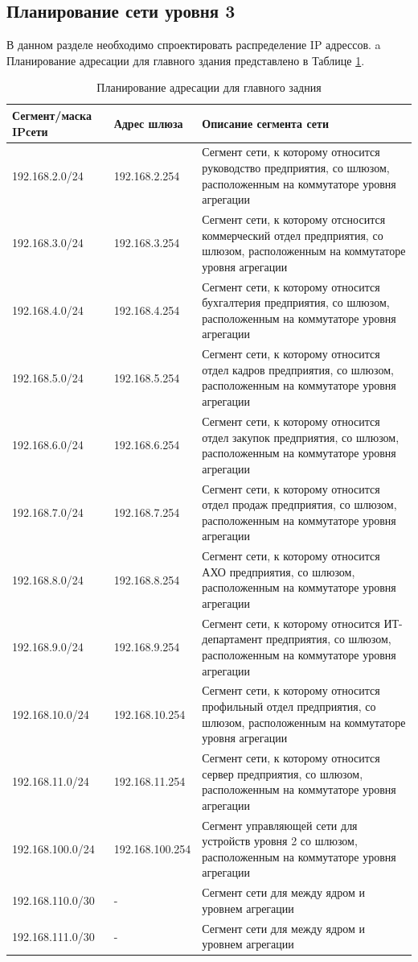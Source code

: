\documentclass[14pt, a4paper]{extarticle}
\numberwithin{equation}{section}
\begin{document}
\subsection{Планирование сети уровня 3}
В данном разделе необходимо спроектировать распределение IP адрессов.
a
Планирование адресации для главного здания представлено в Таблице \ref{table:mainDepIpPlan}.
\begin{table}[H]
\centering
\small
\caption{Планирование адресации для главного задния}
\label{table:mainDepIpPlan}
\begin{tabular}{|m{4cm}|m{3cm}|m{8cm}|}
\hline
\textbf{Сегмент/маска IPсети} & \textbf{Адрес шлюза} & \textbf{Описание сегмента сети} \\
\hline
192.168.2.0/24 & 192.168.2.254 & Сегмент сети, к которому относится руководство предприятия, со шлюзом, расположенным на коммутаторе уровня агрегации
\\ \hline
192.168.3.0/24 & 192.168.3.254 & Сегмент сети, к которому отсносится коммерческий отдел предприятия, со шлюзом, расположенным на коммутаторе уровня агрегации
\\ \hline
192.168.4.0/24 & 192.168.4.254 & Сегмент сети, к которому относится бухгалтерия предприятия, со шлюзом, расположенным на коммутаторе уровня агрегации
\\ \hline
192.168.5.0/24 & 192.168.5.254 & Сегмент сети, к которому относится отдел кадров предприятия, со шлюзом, расположенным на коммутаторе уровня агрегации
\\ \hline
192.168.6.0/24 & 192.168.6.254 & Сегмент сети, к которому относится отдел закупок предприятия, со шлюзом, расположенным на коммутаторе уровня агрегации
\\ \hline
192.168.7.0/24 & 192.168.7.254 & Сегмент сети, к которому относится отдел продаж предприятия, со шлюзом, расположенным на коммутаторе уровня агрегации
\\ \hline
192.168.8.0/24 & 192.168.8.254 & Сегмент сети, к которому относится АХО предприятия, со шлюзом, расположенным на коммутаторе уровня агрегации
\\ \hline
192.168.9.0/24 & 192.168.9.254 & Сегмент сети, к которому относится ИТ-департамент предприятия, со шлюзом, расположенным на коммутаторе уровня агрегации
\\ \hline
192.168.10.0/24 & 192.168.10.254 & Сегмент сети, к которому относится профильный отдел предприятия, со шлюзом, расположенным на коммутаторе уровня агрегации
\\ \hline
192.168.11.0/24 & 192.168.11.254 & Сегмент сети, к которому относится сервер предприятия, со шлюзом, расположенным на коммутаторе уровня агрегации
\\ \hline
192.168.100.0/24 & 192.168.100.254 & Сегмент управляющей сети для устройств уровня 2 со шлюзом, расположенным на коммутаторе уровня агрегации 
\\ \hline
192.168.110.0/30 & - & Сегмент сети для между ядром и уровнем агрегации
\\ \hline
192.168.111.0/30 & - & Сегмент сети для между ядром и уровнем агрегации
\\ \hline
\end{tabular}
\end{table}
\end{document}
